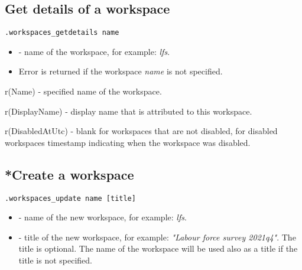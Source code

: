 \subsection{Get details of a workspace}

\begin{lstlisting}[style=CommandLineStyle]
.workspaces_getdetails name
\end{lstlisting}

\paramsheader
\begin{itemize}
\item {} - name of the workspace, for example: \textit{lfs}.
\end{itemize}

\errheader
\begin{itemize}
    \item Error  is returned if the workspace \textit{name} is not specified.
\end{itemize}

\savedres
\begin{compactitem}
    \item r(Name) - specified name of the workspace.
    \item r(DisplayName) - display name that is attributed to this workspace.
    \item r(DisabledAtUtc) - blank for workspaces that are not disabled, for
    disabled workspaces timestamp indicating when the workspace was disabled.
\end{compactitem}


\subsection{*Create a workspace}

\begin{lstlisting}[style=CommandLineStyle]
.workspaces_update name [title]
\end{lstlisting}

\paramsheader
\begin{itemize}
  \item {} - name of the new workspace, for example: \textit{lfs}.
  \item {} - title of the new workspace, for example:
        \textit{"Labour force survey 2021q4"}. The title is optional. The name
        of the workspace will be used also as a title if the title is not
        specified.
\end{itemize}

